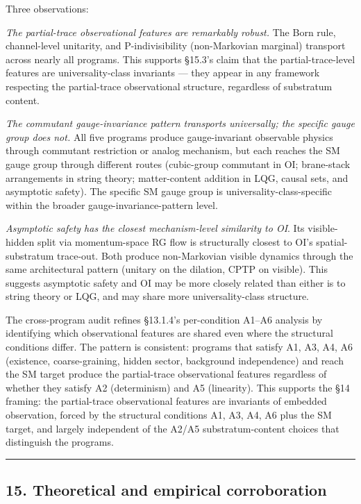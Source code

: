 \documentclass[
]{article}
\begin{document}
Three observations:

\emph{The partial-trace observational features are remarkably robust.}
The Born rule, channel-level unitarity, and P-indivisibility
(non-Markovian marginal) transport across nearly all programs. This
supports §15.3's claim that the partial-trace-level features are
universality-class invariants --- they appear in any framework
respecting the partial-trace observational structure, regardless of
substratum content.

\emph{The commutant gauge-invariance pattern transports universally; the
specific gauge group does not.} All five programs produce
gauge-invariant observable physics through commutant restriction or
analog mechanism, but each reaches the SM gauge group through different
routes (cubic-group commutant in OI; brane-stack arrangements in string
theory; matter-content addition in LQG, causal sets, and asymptotic
safety). The specific SM gauge group is universality-class-specific
within the broader gauge-invariance-pattern level.

\emph{Asymptotic safety has the closest mechanism-level similarity to
OI}. Its visible-hidden split via momentum-space RG flow is structurally
closest to OI's spatial-substratum trace-out. Both produce non-Markovian
visible dynamics through the same architectural pattern (unitary on the
dilation, CPTP on visible). This suggests asymptotic safety and OI may
be more closely related than either is to string theory or LQG, and may
share more universality-class structure.

The cross-program audit refines §13.1.4's per-condition A1--A6 analysis
by identifying which observational features are shared even where the
structural conditions differ. The pattern is consistent: programs that
satisfy A1, A3, A4, A6 (existence, coarse-graining, hidden sector,
background independence) and reach the SM target produce the
partial-trace observational features regardless of whether they satisfy
A2 (determinism) and A5 (linearity). This supports the §14 framing: the
partial-trace observational features are invariants of embedded
observation, forced by the structural conditions A1, A3, A4, A6 plus the
SM target, and largely independent of the A2/A5 substratum-content
choices that distinguish the programs.

\begin{center}\rule{0.5\linewidth}{0.5pt}\end{center}

\hypertarget{theoretical-and-empirical-corroboration}{%
\subsection{15. Theoretical and empirical
corroboration}\label{theoretical-and-empirical-corroboration}}
\end{document}
